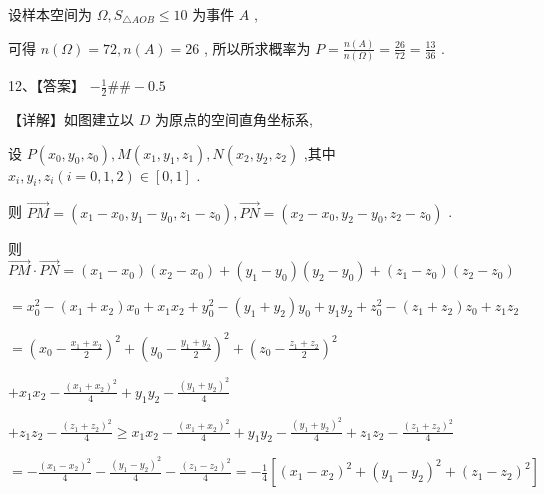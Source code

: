 \documentclass[10pt]{article}
\begin{document}
设样本空间为 \(\Omega ,{S}_{\bigtriangleup {AOB}} \leq  {10}\) 为事件 \(A\) ,

可得 \(n\left( \Omega \right)  = {72},n\left( A\right)  = {26}\) , 所以所求概率为 \(P = \frac{n\left( A\right) }{n\left( \Omega \right) } = \frac{26}{72} = \frac{13}{36}\) .

12、【答案】 \(- \frac{1}{2}\# \#  - {0.5}\)

【详解】如图建立以 \(D\) 为原点的空间直角坐标系,

设 \(P\left( {{x}_{0},{y}_{0},{z}_{0}}\right) ,M\left( {{x}_{1},{y}_{1},{z}_{1}}\right) ,N\left( {{x}_{2},{y}_{2},{z}_{2}}\right)\) ,其中 \({x}_{i},{y}_{i},{z}_{i}\left( {i = 0,1,2}\right)  \in  \left\lbrack  {0,1}\right\rbrack\) .

则 \(\overrightarrow{PM} = \left( {{x}_{1} - {x}_{0},{y}_{1} - {y}_{0},{z}_{1} - {z}_{0}}\right) ,\overrightarrow{PN} = \left( {{x}_{2} - {x}_{0},{y}_{2} - {y}_{0},{z}_{2} - {z}_{0}}\right)\) .

则 \(\overrightarrow{PM} \cdot  \overrightarrow{PN} = \left( {{x}_{1} - {x}_{0}}\right) \left( {{x}_{2} - {x}_{0}}\right)  + \left( {{y}_{1} - {y}_{0}}\right) \left( {{y}_{2} - {y}_{0}}\right)  + \left( {{z}_{1} - {z}_{0}}\right) \left( {{z}_{2} - {z}_{0}}\right)\)

\(= {x}_{0}^{2} - \left( {{x}_{1} + {x}_{2}}\right) {x}_{0} + {x}_{1}{x}_{2} + {y}_{0}^{2} - \left( {{y}_{1} + {y}_{2}}\right) {y}_{0} + {y}_{1}{y}_{2} + {z}_{0}^{2} - \left( {{z}_{1} + {z}_{2}}\right) {z}_{0} + {z}_{1}{z}_{2}\)

\(= {\left( {x}_{0} - \frac{{x}_{1} + {x}_{2}}{2}\right) }^{2} + {\left( {y}_{0} - \frac{{y}_{1} + {y}_{2}}{2}\right) }^{2} + {\left( {z}_{0} - \frac{{z}_{1} + {z}_{2}}{2}\right) }^{2}\)

\(+ {x}_{1}{x}_{2} - \frac{{\left( {x}_{1} + {x}_{2}\right) }^{2}}{4} + {y}_{1}{y}_{2} - \frac{{\left( {y}_{1} + {y}_{2}\right) }^{2}}{4}\)

\(+ {z}_{1}{z}_{2} - \frac{{\left( {z}_{1} + {z}_{2}\right) }^{2}}{4} \geq  {x}_{1}{x}_{2} - \frac{{\left( {x}_{1} + {x}_{2}\right) }^{2}}{4} + {y}_{1}{y}_{2} - \frac{{\left( {y}_{1} + {y}_{2}\right) }^{2}}{4} + {z}_{1}{z}_{2} - \frac{{\left( {z}_{1} + {z}_{2}\right) }^{2}}{4}\)

\(=  - \frac{{\left( {x}_{1} - {x}_{2}\right) }^{2}}{4} - \frac{{\left( {y}_{1} - {y}_{2}\right) }^{2}}{4} - \frac{{\left( {z}_{1} - {z}_{2}\right) }^{2}}{4} =  - \frac{1}{4}\left\lbrack  {{\left( {x}_{1} - {x}_{2}\right) }^{2} + {\left( {y}_{1} - {y}_{2}\right) }^{2} + {\left( {z}_{1} - {z}_{2}\right) }^{2}}\right\rbrack\)
\end{document}
